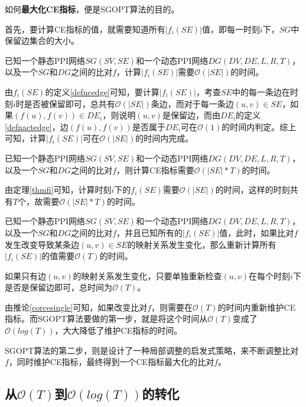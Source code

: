 如何\textbf{最大化CE指标}，便是SGOPT算法的目的。

首先，要计算CE指标的值，就需要知道所有$|f_i(SE)|$值，即每一时刻$i$下，$SG$中保留边集合的大小。


\begin{thm}
\label{thmfi}
已知一个静态PPI网络$SG(SV,SE)$和一个动态PPI网络$DG(DV,DE,L,R,T)$，以及一个$SG$和$DG$之间的比对$f$，计算$|f_i(SE)|$需要$\mathcal{O}(|SE|)$的时间。
\end{thm}
\begin{proof2}
由$f_i(SE)$的定义\ref{defncedge}可知，要计算$|f_i(SE)|$，考查$SE$中的每一条边在时刻$i$时是否被保留即可，总共有$\mathcal{O}(|SE|)$条边，而对于每一条边$(u,v)\in SE$，如果$(f(u),f(v))\in DE_i$，则说明$(u,v)$是保留边，而由$DE_i$的定义\ref{defnactedge}，边$(f(u),f(v))$是否属于$DE_i$可在$\mathcal{O}(1)$的时间内判定。综上可知，计算$|f_i(SE)|$可在$\mathcal{O}(|SE|)$的时间内完成。
\end{proof2}
\begin{cor}
\label{corceforce}
已知一个静态PPI网络$SG(SV,SE)$和一个动态PPI网络$DG(DV,DE,L,R,T)$，以及一个$SG$和$DG$之间的比对$f$，则计算CE指标需要$\mathcal{O}(|SE|*T)$的时间。
\end{cor}
\begin{proof2}
由定理\ref{thmfi}可知，计算时刻$i$下的$f_i(SE)$需要$\mathcal{O}(|SE|)$的时间，这样的时刻共有$T$个，故需要$\mathcal{O}(|SE|*T)$的时间。
\end{proof2}
\begin{cor}
\label{corcesingle}
已知一个静态PPI网络$SG(SV,SE)$和一个动态PPI网络$DG(DV,DE,L,R,T)$，以及一个$SG$和$DG$之间的比对$f$，并且已知所有的$|f_i(SE)|$值，此时，如果比对$f$发生改变导致某条边$(u,v)\in SE$的映射关系发生变化，那么重新计算所有$|f_i(SE)|$的值需要$\mathcal{O}(T)$的时间。
\end{cor}
\begin{proof2}
如果只有边$(u,v)$的映射关系发生变化，只要单独重新检查$(u,v)$在每个时刻$i$下是否是保留边即可，总时间为$\mathcal{O}(T)$。
\end{proof2}
由推论\ref{corcesingle}可知，如果改变比对$f$，则需要在$\mathcal{O}(T)$的时间内重新维护CE指标。而SGOPT算法要做的第一步，就是将这个时间从$\mathcal{O}(T)$变成了$\mathcal{O}(log(T))$，大大降低了维护CE指标的时间。

SGOPT算法的第二步，则是设计了一种局部调整的启发式策略，来不断调整比对$f$，同时维护CE指标，最终得到一个CE指标最大化的比对$f$。
\subsection{从$\mathcal{O}(T)$到$\mathcal{O}(log(T))$的转化}

